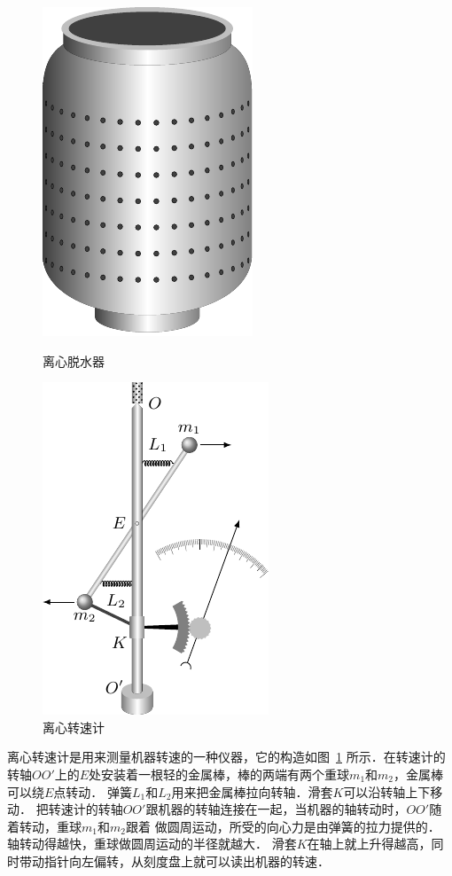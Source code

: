 \begin{figure}[htbp]
    \centering
	\begin{minipage}[t]{0.48\textwidth}
		\centering
        \includegraphics{fig/A/4-29.pdf}
        \caption{离心脱水器}\label{fig_A_4-29}
	\end{minipage}
	\begin{minipage}[t]{0.48\textwidth}
        \centering
        \includegraphics{fig/A/4-30.pdf}
        \caption{离心转速计}\label{fig_A_4-30}
	\end{minipage}
\end{figure}

离心转速计是用来测量机器转速的一种仪器，它的构造如图~\ref{fig_A_4-30} 所示．在转速计的转轴$OO'$上的$E$处安装着一根轻的金属棒，棒的两端有两个重球$m_1$和$m_2$，金属棒可以绕$E$点转动．
弹簧$L_1$和$L_2$用来把金属棒拉向转轴．滑套$K$可以沿转轴上下移动．
把转速计的转轴$OO'$跟机器的转轴连接在一起，当机器的轴转动时，$OO'$随着转动，重球$m_1$和$m_2$跟着
做圆周运动，所受的向心力是由弹簧的拉力提供的．
轴转动得越快，重球做圆周运动的半径就越大．
滑套$K$在轴上就上升得越高，同时带动指针向左偏转，从刻度盘上就可以读出机器的转速．


